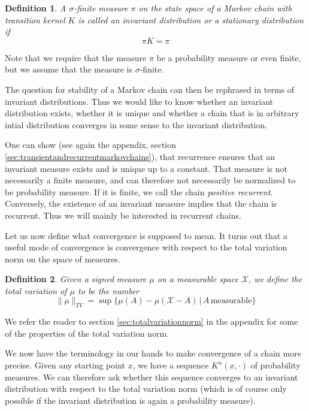 \documentclass[a4paper, draft]{article}
\theoremstyle{own}
\newtheorem{defn}{Definition}[section]
\theoremstyle{remark}
\begin{document}
\begin{defn}
A $\sigma$-finite measure $\pi$ on the state space of a Markov chain with transition kernel $K$ is called an {\em invariant distribution} or a {\em stationary distribution} if
$$
\pi K = \pi
$$
\end{defn}

Note that we require that the measure $\pi$ be a probability measure or even finite, but we assume that the measure is $\sigma$-finite. 

The question for stability of a Markov chain can then be rephrased in terms of invariant distributions. Thus we would like to know whether an invariant distribution exists, whether it is unique and whether a chain that is in arbitrary intial distribution converges in some sense to the invariant distribution.

One can show (see again the appendix, section \ref{sec:transientandrecurrentmarkovchains}), that recurrence ensures that an invariant measure exists and is unique up to a constant. That measure is not necessarily a finite measure, and can therefore not necessarily be normalized to be probability measure. If it is finite, we call the chain {\em positive recurrent}. Conversely, the existence of an invariant measure implies that the chain is recurrent. Thus we will mainly be interested in recurrent chains.


Let us now define what convergence is supposed to mean. It turns out that a useful mode of convergence is convergence with respect to the total variation norm on the space of measures. 

\begin{defn}
Given a signed measure $\mu$ on a measurable space ${\mathcal X}$, we define the {\em total variation} of $\mu$ to be the number
$$
\| \mu \|_{TV} = \sup \{  \mu(A) - \mu({\mathcal X} - A) \, | \, A \,  \text{measurable}  \}
$$
\end{defn}

We refer the reader to section \ref{sec:totalvariationnorm} in the appendix for some of the properties of the total variation norm.

We now have the terminology in our hands to make convergence of a chain more precise. Given any starting point $x$, we have a sequence $K^n(x, \cdot)$ of probability measures. We can therefore ask whether this sequence converges to an invariant distribution with respect to the total variation norm (which is of course only possible if the invariant distribution is again a probability measure). 
\end{document}
